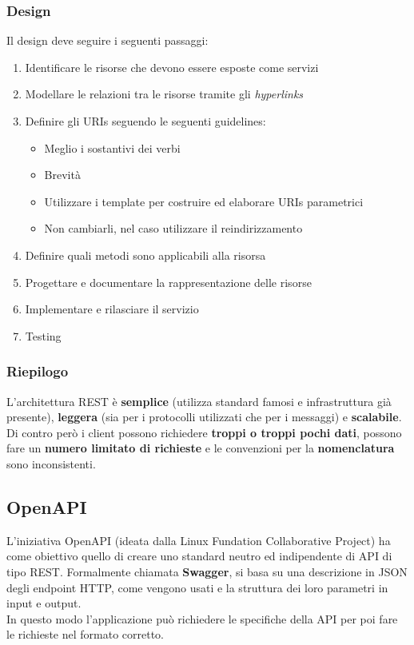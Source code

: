 \subsubsection{Design}
Il design deve seguire i seguenti passaggi:
\begin{enumerate}
	\item Identificare le risorse che devono essere esposte come servizi
	\item Modellare le relazioni tra le risorse tramite gli \textit{hyperlinks}
	\item Definire gli URIs seguendo le seguenti guidelines:
	\begin{itemize}
		\item Meglio i sostantivi dei verbi
		\item Brevità
		\item Utilizzare i template per costruire ed elaborare URIs parametrici
		\item Non cambiarli, nel caso utilizzare il reindirizzamento
	\end{itemize}
	\item Definire quali metodi sono applicabili alla risorsa
	\item Progettare e documentare la rappresentazione delle risorse
	\item Implementare e rilasciare il servizio
	\item Testing
\end{enumerate}
\subsubsection{Riepilogo}
L'architettura REST è \textbf{semplice} (utilizza standard famosi e infrastruttura già presente), \textbf{leggera} (sia per i protocolli utilizzati che per i messaggi) e \textbf{scalabile}. Di contro però i client possono richiedere \textbf{troppi o troppi pochi dati}, possono fare un \textbf{numero limitato di richieste} e le convenzioni per la \textbf{nomenclatura} sono inconsistenti.

\subsection{OpenAPI}
L'iniziativa OpenAPI (ideata dalla Linux Fundation Collaborative Project) ha come obiettivo quello di creare uno standard neutro ed indipendente di API di tipo REST. Formalmente chiamata \textbf{Swagger}, si basa su una descrizione in JSON degli endpoint HTTP, come vengono usati e la struttura dei loro parametri in input e output.\\
In questo modo l'applicazione può richiedere le specifiche della API per poi fare le richieste nel formato corretto.

